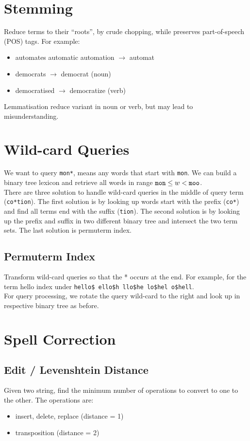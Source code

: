 \begin{multicols*}{2}
\section{Stemming}
\noindent Reduce terms to their “roots”, by crude chopping, while preserves part-of-speech (POS) tags. For example:
\begin{itemize}
    \item automates automatic automation $\rightarrow$ automat
    \item democrats $\rightarrow$ democrat (noun)
    \item democratised $\rightarrow$ democratize (verb)
\end{itemize}
\noindent Lemmatisation reduce variant in noun or verb, but may lead to misunderstanding. 

\section{Wild-card Queries}
\noindent We want to query \verb|mon*|, means any words that start with \verb|mon|. We can build a binary tree lexicon and retrieve all words in range $\verb|mon|\le w < \verb|moo|$. \\

\noindent There are three solution to handle wild-card queries in the middle of query term (\verb|co*tion|). The first solution is by looking up words start with the prefix (\verb|co*|) and find all terms end with the suffix (\verb|tion|). The second solution is by looking up the prefix and suffix in two different binary tree and intersect the two term sets. The last solution is permuterm index. 

\subsection{Permuterm Index}
\noindent Transform wild-card queries so that the * occurs at the end. For example, for the term hello index under \verb|hello$ ello$h llo$he lo$hel o$hell|. \\

\noindent For query processing, we rotate the query wild-card to the right and look up in respective binary tree as before. 

\section{Spell Correction}
\subsection{Edit / Levenshtein Distance}
\noindent Given two string, find the minimum number of operations to convert to one to the other. The operations are:
\begin{itemize}
    \item insert, delete, replace (distance = 1)
    \item transposition (distance = 2)
\end{itemize}


\end{multicols*}

